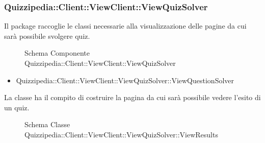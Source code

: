 \subsubsection{Quizzipedia::Client::ViewClient::ViewQuizSolver}
Il package raccoglie le classi necessarie alla visualizzazione delle pagine da cui sarà possibile svolgere quiz.
\begin{figure}[H]
\centering
\noindent{}
\caption{Schema Componente Quizzipedia::Client::ViewClient::ViewQuizSolver}
\end{figure}
\begin{itemize}
\item Quizzipedia::Client::ViewClient::ViewQuizSolver::ViewQuestionSolver
\end{itemize}
La classe ha il compito di costruire la pagina da cui sarà possibile vedere l'esito di un quiz.
\begin{figure}[H]
\centering
\noindent{}
\caption{Schema Classe Quizzipedia::Client::ViewClient::ViewQuizSolver::ViewResults}
\end{figure}
